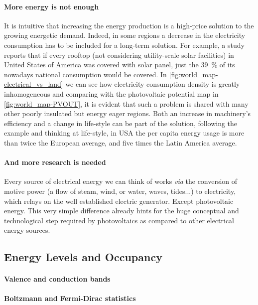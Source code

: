 	\paragraph{More energy is not enough} It is intuitive that increasing the energy production is a high-price solution to the growing energetic demand.
	Indeed, in some regions a decrease in the electricity consumption has to be included for a long-term solution.
	For example, a study\cite{Margolis2016} reports that if every rooftop (not considering utility-scale solar facilities) in United States of America was covered with solar panel, just the 39~\% of its nowadays national consumption would be covered.
	In \cref{fig:world_map-electrical_vs_land} we can see how electricity consumption density is greatly inhomogeneous and comparing with the photovoltaic potential map in \cref{fig:world_map-PVOUT}, it is evident that such a problem is shared with many other poorly insulated but energy eager regions.
	Both an increase in machinery's efficiency and a change in life-style can be part of the solution, following the example and thinking at life-style, in USA the per capita energy usage is more than twice the European average, and five times the Latin America average.\cite{IEA}

	\paragraph{And more research is needed} Every source of electrical energy we can think of works \textit{via} the conversion of motive power (a flow of steam, wind, or water, waves, tides...) to electricity, which relays on the well established electric generator.
	Except photovoltaic energy.
	This very simple difference already hints for the huge conceptual and technological step required by photovoltaics as compared to other electrical energy sources.


	\subsection{Energy Levels and Occupancy}

		\paragraph{Valence and conduction bands}

		\paragraph{Boltzmann and Fermi-Dirac statistics}

